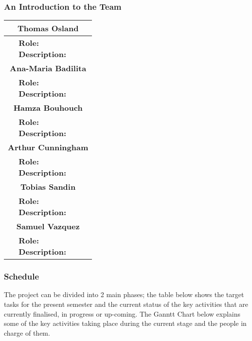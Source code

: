 \documentclass[12pt]{article}
\begin{document}
\subsubsection{An Introduction to the Team}

\setlength\arrayrulewidth{0.7pt}
\begin{table}[!htpb]
    \begin{tabular}{ |p{3cm}|p{9cm}| }
        \hline
        \multicolumn{2}{|c|}{\textbf{Thomas Osland}} \\
        \hline
        & \makecell[tl]{\textbf{Role:} \\ \textbf{Description:}} \\
        \hline
        \multicolumn{2}{|c|}{\textbf{Ana-Maria Badilita}} \\
        \hline
        & \makecell[tl]{\textbf{Role:} \\ \textbf{Description:}} \\
        \hline
        \multicolumn{2}{|c|}{\textbf{Hamza Bouhouch}} \\
        \hline
        & \makecell[tl]{\textbf{Role:} \\ \textbf{Description:}} \\
        \hline
        \multicolumn{2}{|c|}{\textbf{Arthur Cunningham}} \\
        \hline
        & \makecell[tl]{\textbf{Role:} \\ \textbf{Description:}} \\
        \hline
        \multicolumn{2}{|c|}{\textbf{Tobias Sandin}} \\\hline
        & \makecell[tl]{\textbf{Role:} \\ \textbf{Description:}} \\
        \hline
        \multicolumn{2}{|c|}{\textbf{Samuel Vazquez}} \\
        \hline
        & \makecell[tl]{\textbf{Role:} \\ \textbf{Description:}} \\
        \hline
        \end{tabular}
\end{table}

\newpage

\subsubsection{Schedule}

The project can be divided into 2 main phases; the table below shows the target tasks for the present semester and the current status of the key activities that are currently finalised, in progress or up-coming. 
The Ganntt Chart below explains some of the key activities taking place during the current stage and the people in charge of them.
\end{document}
